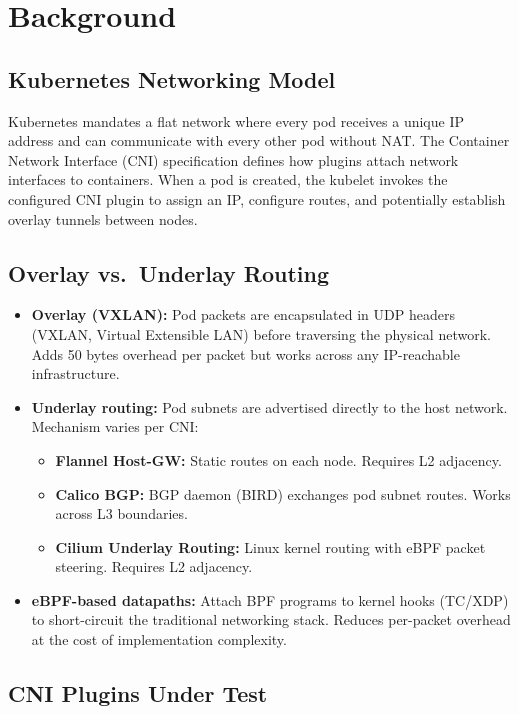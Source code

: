 \documentclass[11pt,a4paper]{article}
\begin{document}
\section{Background}

\subsection{Kubernetes Networking Model}

Kubernetes mandates a flat network where every pod receives a unique IP address and can communicate with every other pod without NAT. The Container Network Interface (CNI) specification defines how plugins attach network interfaces to containers. When a pod is created, the kubelet invokes the configured CNI plugin to assign an IP, configure routes, and potentially establish overlay tunnels between nodes.

\subsection{Overlay vs.\ Underlay Routing}

\begin{itemize}
  \item \textbf{Overlay (VXLAN):} Pod packets are encapsulated in UDP headers (VXLAN, Virtual Extensible LAN) before traversing the physical network. Adds 50 bytes overhead per packet but works across any IP-reachable infrastructure.
  \item \textbf{Underlay routing:} Pod subnets are advertised directly to the host network. Mechanism varies per CNI:
  \begin{itemize}
    \item \textbf{Flannel Host-GW:} Static routes on each node. Requires L2 adjacency.
    \item \textbf{Calico BGP:} BGP daemon (BIRD) exchanges pod subnet routes. Works across L3 boundaries.
    \item \textbf{Cilium Underlay Routing:} Linux kernel routing with eBPF packet steering. Requires L2 adjacency.
  \end{itemize}
  \item \textbf{eBPF-based datapaths:} Attach BPF programs to kernel hooks (TC/XDP) to short-circuit the traditional networking stack. Reduces per-packet overhead at the cost of implementation complexity.
\end{itemize}

\subsection{CNI Plugins Under Test}
\end{document}
